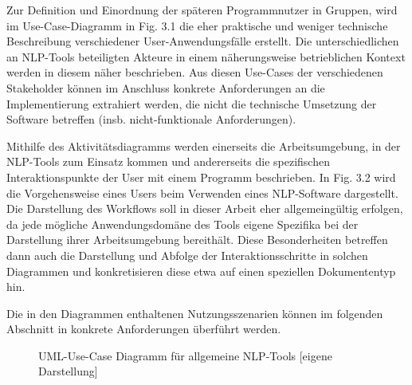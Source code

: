 \documentclass[12pt]{report}
\begin{document}
Zur Definition und Einordnung der späteren Programmnutzer in Gruppen, wird im  Use-Case-Diagramm in Fig. 3.1 die eher praktische und weniger technische Beschreibung verschiedener User-Anwendungsfälle erstellt. Die unterschiedlichen an NLP-Tools beteiligten Akteure in einem näherungsweise betrieblichen Kontext werden in diesem näher beschrieben. Aus diesen Use-Cases der verschiedenen Stakeholder können im Anschluss konkrete Anforderungen an die Implementierung extrahiert werden, die nicht die technische Umsetzung der Software betreffen (insb. nicht-funktionale Anforderungen).

Mithilfe des Aktivitätsdiagramms werden einerseits die Arbeitsumgebung, in der NLP-Tools zum Einsatz kommen und andererseits die spezifischen Interaktionspunkte der User mit einem Programm beschrieben. In Fig. 3.2 wird die Vorgehensweise eines Users beim Verwenden eines NLP-Software dargestellt. Die Darstellung des Workflows soll in dieser Arbeit eher allgemeingültig erfolgen, da jede mögliche Anwendungsdomäne des Tools eigene Spezifika bei der Darstellung ihrer Arbeitsumgebung bereithält. Diese Besonderheiten betreffen dann auch die Darstellung und Abfolge der Interaktionsschritte in solchen Diagrammen und konkretisieren diese etwa auf einen speziellen Dokumententyp hin.

Die in den Diagrammen enthaltenen Nutzungsszenarien können im folgenden Abschnitt in konkrete Anforderungen überführt werden.

\begin{figure}
\begin{center}
\caption{UML-Use-Case Diagramm für allgemeine NLP-Tools [eigene Darstellung]}
\end{center}
\end{figure}
\end{document}
